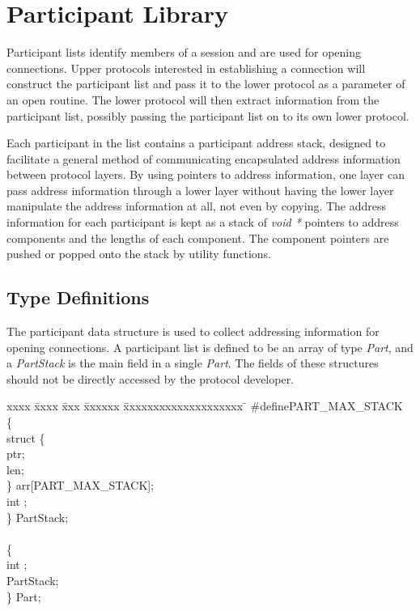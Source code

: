 % 
%
%
%
%
%


\section{Participant Library}\label{part}

Participant lists identify members of a session and are used for
opening connections.  Upper protocols interested in establishing a
connection will construct the participant list and pass it to the
lower protocol as a parameter of an open routine.  The lower protocol
will then extract information from the participant list, possibly
passing the participant list on to its own lower protocol.

Each participant in the list contains a participant address stack,
designed to facilitate a general method of communicating encapsulated
address information between protocol layers.  By using pointers to
address information, one layer can pass address information through a
lower layer without having the lower layer manipulate the address
information at all, not even by copying.  The address information for
each participant is kept as a stack of {\em void *} pointers to
address components and the lengths of each component.
The component pointers are pushed or popped onto
the stack by utility functions.

\subsection{Type Definitions}

The participant data structure is used to collect addressing
information for opening connections.  A participant list is defined to
be an array of type {\em Part}, and a {\em PartStack} is the main
field in a single {\em Part}. The fields of these structures should
not be directly accessed by the protocol developer.

\begin{tabbing}
xxxx \= xxxx \= xxx \= xxxxxx \= xxxxxxxxxxxxxxxxxxxx \= \kill
\>\#define\>\>\>PART\_MAX\_STACK\\

  \{\\
\>\>    struct \{\\
\>\>            \>ptr;\\
\>\>               \>len;\\
\>\>    \} {\caps arr}[PART\_MAX\_STACK];\\
\>\>    {\sem int}	\>;\\
\>\} {\bold PartStack};\\
\\
 \{\\
\>\>    {\sem int}	\>;\\
\>\>    {\sem PartStack}\>; \\
\>\} {\bold Part};
\end{tabbing}

